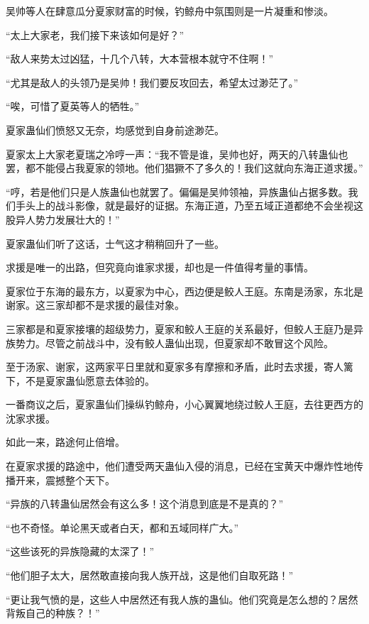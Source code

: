
\begin{this_body}



吴帅等人在肆意瓜分夏家财富的时候，钓鲸舟中氛围则是一片凝重和惨淡。

“太上大家老，我们接下来该如何是好？”

“敌人来势太过凶猛，十几个八转，大本营根本就守不住啊！”

“尤其是敌人的头领乃是吴帅！我们要反攻回去，希望太过渺茫了。”

“唉，可惜了夏英等人的牺牲。”

夏家蛊仙们愤怒又无奈，均感觉到自身前途渺茫。

夏家太上大家老夏瑞之冷哼一声：“我不管是谁，吴帅也好，两天的八转蛊仙也罢，都不能侵占我夏家的领地。他们猖獗不了多久的！我们这就向东海正道求援。”

“哼，若是他们只是人族蛊仙也就罢了。偏偏是吴帅领袖，异族蛊仙占据多数。我们手头上的战斗影像，就是最好的证据。东海正道，乃至五域正道都绝不会坐视这股异人势力发展壮大的！”

夏家蛊仙们听了这话，士气这才稍稍回升了一些。

求援是唯一的出路，但究竟向谁家求援，却也是一件值得考量的事情。

夏家位于东海的最东方，以夏家为中心，西边便是鲛人王庭。东南是汤家，东北是谢家。这三家却都不是求援的最佳对象。

三家都是和夏家接壤的超级势力，夏家和鲛人王庭的关系最好，但鲛人王庭乃是异族势力。尽管之前战斗中，没有鲛人蛊仙出现，但夏家却不敢冒这个风险。

至于汤家、谢家，这两家平日里就和夏家多有摩擦和矛盾，此时去求援，寄人篱下，不是夏家蛊仙愿意去体验的。

一番商议之后，夏家蛊仙们操纵钓鲸舟，小心翼翼地绕过鲛人王庭，去往更西方的沈家求援。

如此一来，路途何止倍增。

在夏家求援的路途中，他们遭受两天蛊仙入侵的消息，已经在宝黄天中爆炸性地传播开来，震撼整个天下。

“异族的八转蛊仙居然会有这么多！这个消息到底是不是真的？”

“也不奇怪。单论黑天或者白天，都和五域同样广大。”

“这些该死的异族隐藏的太深了！”

“他们胆子太大，居然敢直接向我人族开战，这是他们自取死路！”

“更让我气愤的是，这些人中居然还有我人族的蛊仙。他们究竟是怎么想的？居然背叛自己的种族？！”


\end{this_body}
